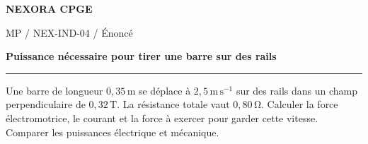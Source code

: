 \documentclass[11pt,a4paper]{article}
\begin{document}
{\small\bfseries\color{nexorablue} NEXORA CPGE}\par
{\small MP / NEX-IND-04 / Énoncé}\par
{\LARGE\bfseries Puissance nécessaire pour tirer une barre sur des rails}\par
\vspace{0.25em}\hrule\vspace{0.6em}

Une barre de longueur $0{,}35\,\mathrm m$ se déplace à $2{,}5\,\mathrm{m\,s^{-1}}$ sur des rails dans un champ perpendiculaire de $0{,}32\,\mathrm T$. La résistance totale vaut $0{,}80\,\mathrm\Omega$. Calculer la force électromotrice, le courant et la force à exercer pour garder cette vitesse. Comparer les puissances électrique et mécanique.
\end{document}
